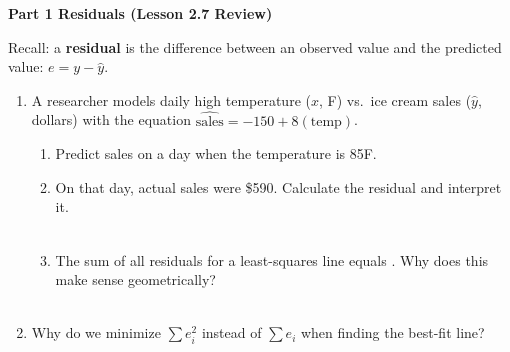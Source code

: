 \documentclass[10pt]{article}
\begin{document}
\namedateperiod

\vspace{0.3in}

{\large\bfseries\color{navy} Part 1 \quad Residuals (Lesson 2.7 Review)}

\vspace{0.12in}
\noindent Recall: a \textbf{residual} is the difference between an observed value and the
predicted value: $e = y - \hat{y}$.

\vspace{0.1in}

\begin{enumerate}[leftmargin=1.6em, itemsep=0.22in]

  \item A researcher models daily high temperature ($x$, \textdegree F) vs.\ ice cream sales
        ($\hat{y}$, dollars) with the equation $\widehat{\text{sales}} = -150 + 8(\text{temp})$.

        \begin{enumerate}[label=\textbf{(\alph*)}, leftmargin=1.6em, itemsep=8pt]
          \item Predict sales on a day when the temperature is 85\textdegree F.\\[8pt]
                \writeline

          \item On that day, actual sales were \$590. Calculate the residual and interpret it.\\[8pt]
                \writeline\\[1pt]\writeline

          \item The sum of all residuals for a least-squares line equals \blank{2cm}.
                Why does this make sense geometrically?\\[8pt]
                \writeline\\[1pt]\writeline
        \end{enumerate}

  \item Why do we minimize $\sum e_i^2$ instead of $\sum e_i$ when finding the best-fit line?\\[8pt]
        \writeline\\[1pt]\writeline

\end{enumerate}

\vspace{0.22in}
\end{document}
